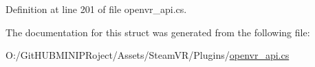Definition at line 201 of file openvr\+\_\+api.\+cs.



The documentation for this struct was generated from the following file\+:\begin{DoxyCompactItemize}
\item 
O\+:/\+Git\+H\+U\+B\+M\+I\+N\+I\+P\+Roject/\+Assets/\+Steam\+V\+R/\+Plugins/\mbox{\hyperlink{openvr__api_8cs}{openvr\+\_\+api.\+cs}}\end{DoxyCompactItemize}
